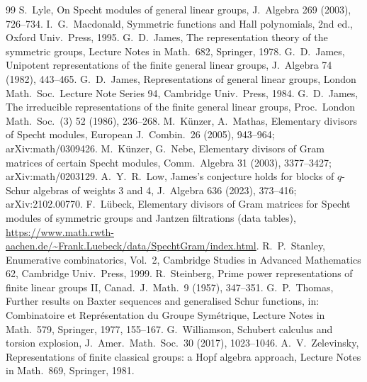 \documentclass[11pt, letterpaper]{amsart}
\theoremstyle{definition}
\theoremstyle{remark}
\begin{document}
\begin{thebibliography}{99}
 S.\ Lyle, On Specht modules of general linear groups, J.\ Algebra 269 (2003), 726--734.
 I.\ G.\ Macdonald, Symmetric functions and Hall polynomials, 2nd ed., Oxford Univ.\ Press, 1995.
 G.\ D.\ James, The representation theory of the symmetric groups, Lecture Notes in Math.\ 682, Springer, 1978.
 G.\ D.\ James, Unipotent representations of the finite general linear groups, J.\ Algebra 74 (1982), 443--465.
 G.\ D.\ James, Representations of general linear groups, London Math.\ Soc.\ Lecture Note Series 94, Cambridge Univ.\ Press, 1984.
 G.\ D.\ James, The irreducible representations of the finite general linear groups, Proc.\ London Math.\ Soc.\ (3) 52 (1986), 236--268.
 M.\ K\"unzer, A.\ Mathas, Elementary divisors of Specht modules, European J.\ Combin.\ 26 (2005), 943--964; arXiv:math/0309426.
 M.\ K\"unzer, G.\ Nebe, Elementary divisors of Gram matrices of certain Specht modules, Comm.\ Algebra 31 (2003), 3377--3427; arXiv:math/0203129.
 A.\ Y.\ R.\ Low, James's conjecture holds for blocks of $q$-Schur algebras of weights 3 and 4, J.\ Algebra 636 (2023), 373--416; arXiv:2102.00770.
 F.\ L\"ubeck, Elementary divisors of Gram matrices for Specht modules of symmetric groups and Jantzen filtrations (data tables), \url{https://www.math.rwth-aachen.de/~Frank.Luebeck/data/SpechtGram/index.html}.
 R.\ P.\ Stanley, Enumerative combinatorics, Vol.\ 2, Cambridge Studies in Advanced Mathematics 62, Cambridge Univ.\ Press, 1999.
 R.\ Steinberg, Prime power representations of finite linear groups II, Canad.\ J.\ Math.\ 9 (1957), 347--351.
 G.\ P.\ Thomas, Further results on Baxter sequences and generalised Schur functions, in: Combinatoire et Repr\'esentation du Groupe Sym\'etrique, Lecture Notes in Math.\ 579, Springer, 1977, 155--167.
 G.\ Williamson, Schubert calculus and torsion explosion, J.\ Amer.\ Math.\ Soc.\ 30 (2017), 1023--1046.
 A.\ V.\ Zelevinsky, Representations of finite classical groups: a Hopf algebra approach, Lecture Notes in Math.\ 869, Springer, 1981.
\end{thebibliography}
\end{document}
